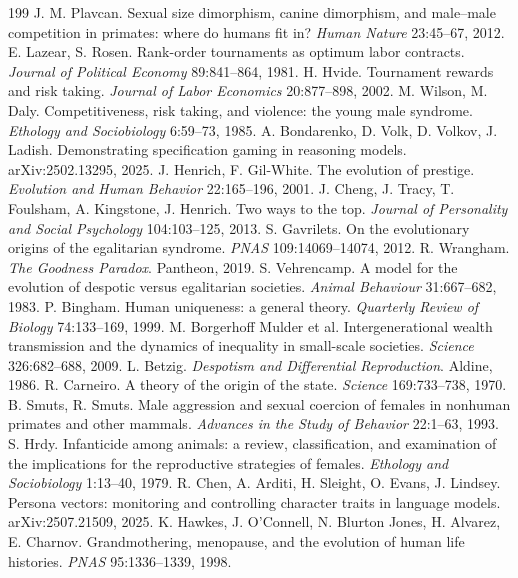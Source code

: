 \documentclass[10pt,twocolumn]{article}
\theoremstyle{plain}
\theoremstyle{definition}
\begin{document}
\begin{thebibliography}{199}
 J. M. Plavcan. Sexual size dimorphism, canine dimorphism, and male--male competition in primates: where do humans fit in? \emph{Human Nature} 23:45--67, 2012.
 E. Lazear, S. Rosen. Rank-order tournaments as optimum labor contracts. \emph{Journal of Political Economy} 89:841--864, 1981.
 H. Hvide. Tournament rewards and risk taking. \emph{Journal of Labor Economics} 20:877--898, 2002.
 M. Wilson, M. Daly. Competitiveness, risk taking, and violence: the young male syndrome. \emph{Ethology and Sociobiology} 6:59--73, 1985.
 A. Bondarenko, D. Volk, D. Volkov, J. Ladish. Demonstrating specification gaming in reasoning models. arXiv:2502.13295, 2025.
 J. Henrich, F. Gil-White. The evolution of prestige. \emph{Evolution and Human Behavior} 22:165--196, 2001.
 J. Cheng, J. Tracy, T. Foulsham, A. Kingstone, J. Henrich. Two ways to the top. \emph{Journal of Personality and Social Psychology} 104:103--125, 2013.
 S. Gavrilets. On the evolutionary origins of the egalitarian syndrome. \emph{PNAS} 109:14069--14074, 2012.
 R. Wrangham. \emph{The Goodness Paradox}. Pantheon, 2019.
 S. Vehrencamp. A model for the evolution of despotic versus egalitarian societies. \emph{Animal Behaviour} 31:667--682, 1983.
 P. Bingham. Human uniqueness: a general theory. \emph{Quarterly Review of Biology} 74:133--169, 1999.
 M. Borgerhoff Mulder et al. Intergenerational wealth transmission and the dynamics of inequality in small-scale societies. \emph{Science} 326:682--688, 2009.
 L. Betzig. \emph{Despotism and Differential Reproduction}. Aldine, 1986.
 R. Carneiro. A theory of the origin of the state. \emph{Science} 169:733--738, 1970.
 B. Smuts, R. Smuts. Male aggression and sexual coercion of females in nonhuman primates and other mammals. \emph{Advances in the Study of Behavior} 22:1--63, 1993.
 S. Hrdy. Infanticide among animals: a review, classification, and examination of the implications for the reproductive strategies of females. \emph{Ethology and Sociobiology} 1:13--40, 1979.
 R. Chen, A. Arditi, H. Sleight, O. Evans, J. Lindsey. Persona vectors: monitoring and controlling character traits in language models. arXiv:2507.21509, 2025.
 K. Hawkes, J. O'Connell, N. Blurton Jones, H. Alvarez, E. Charnov. Grandmothering, menopause, and the evolution of human life histories. \emph{PNAS} 95:1336--1339, 1998.

\end{thebibliography}
\end{document}
